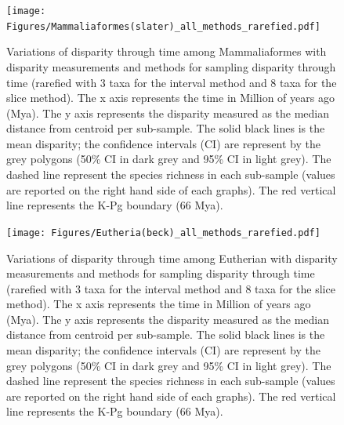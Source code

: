 \documentclass[12pt,letterpaper]{article}
\begin{document}
\begin{landscape}
\begin{figure}[!htbp]
\centering
    \texttt{[image: Figures/Mammaliaformes(slater)\_all\_methods\_rarefied.pdf]}
\caption{Variations of disparity through time among Mammaliaformes with disparity measurements and methods for sampling disparity through time (rarefied with 3 taxa for the interval method and 8 taxa for the slice method). The x axis represents the time in Million of years ago (Mya). The y axis represents the disparity measured as the median distance from centroid per sub-sample. The solid black lines is the mean disparity; the confidence intervals (CI) are represent by the grey polygons (50\% CI in dark grey and 95\% CI in light grey). The dashed line represent the species richness in each sub-sample (values are reported on the right hand side of each graphs). The red vertical line represents the K-Pg boundary (66 Mya).}
\end{figure}
\end{landscape}

\begin{landscape}
\begin{figure}[!htbp]
\centering
    \texttt{[image: Figures/Eutheria(beck)\_all\_methods\_rarefied.pdf]}
\caption{Variations of disparity through time among Eutherian with disparity measurements and methods for sampling disparity through time (rarefied with 3 taxa for the interval method and 8 taxa for the slice method). The x axis represents the time in Million of years ago (Mya). The y axis represents the disparity measured as the median distance from centroid per sub-sample. The solid black lines is the mean disparity; the confidence intervals (CI) are represent by the grey polygons (50\% CI in dark grey and 95\% CI in light grey). The dashed line represent the species richness in each sub-sample (values are reported on the right hand side of each graphs). The red vertical line represents the K-Pg boundary (66 Mya).}
\end{figure}
\end{landscape}




\end{document}
